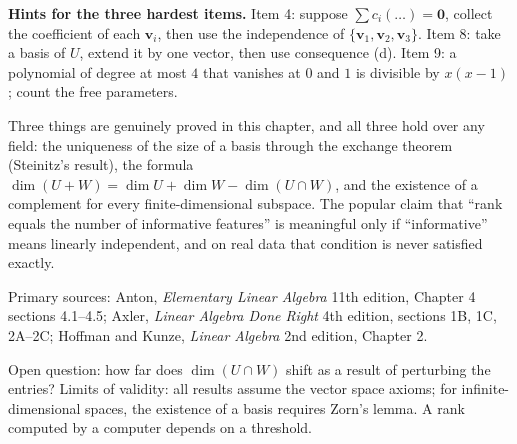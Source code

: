 \begin{latihan}
\noindent\textbf{Hints for the three hardest items.} Item 4: suppose
$\sum c_{i}(\dots)=\mathbf{0}$, collect the coefficient of each $\mathbf{v}_{i}$, then use the
independence of $\{\mathbf{v}_{1},\mathbf{v}_{2},\mathbf{v}_{3}\}$. Item 8: take a basis of $U$,
extend it by one vector, then use consequence (d). Item 9: a polynomial of degree at most
$4$ that vanishes at $0$ and $1$ is divisible by $x(x-1)$; count the free parameters.
\end{latihan}

\begin{untukpeneliti}
Three things are genuinely proved in this chapter, and all three hold over any field: the
uniqueness of the size of a basis through the exchange theorem (Steinitz's result), the formula
$\dim(U+W)=\dim U+\dim W-\dim(U\cap W)$, and the existence of a complement for every
finite-dimensional subspace. The popular claim that ``rank equals the number of informative
features'' is meaningful only if ``informative'' means linearly independent, and on real data that
condition is never satisfied exactly.

Primary sources: Anton, \emph{Elementary Linear Algebra} 11th edition, Chapter 4 sections
4.1--4.5; Axler, \emph{Linear Algebra Done Right} 4th edition, sections 1B, 1C, 2A--2C; Hoffman and
Kunze, \emph{Linear Algebra} 2nd edition, Chapter 2.

Open question: how far does $\dim(U\cap W)$ shift as a result of perturbing the entries? Limits of
validity: all results assume the vector space axioms; for infinite-dimensional spaces, the
existence of a basis requires Zorn's lemma. A rank computed by a computer depends on a threshold.
\end{untukpeneliti}


